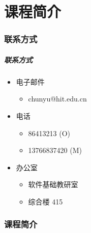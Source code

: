 
\part{课程简介}

\section{联系方式}
\begin{frame}
\frametitle{联系方式}
\begin{itemize}
\setlength{\itemsep}{8pt plus 1pt}
\item 电子邮件
  \begin{itemize}
  \item chunyu@hit.edu.cn
  \end{itemize}
\item 电话
  \begin{itemize}
  \item 86413213 (O)
  \item 13766837420 (M)
  \end{itemize}
\item 办公室
  \begin{itemize}
  \item 软件基础教研室
  \item 综合楼 415
  \end{itemize}
\end{itemize}
\end{frame}

\section{课程简介}

